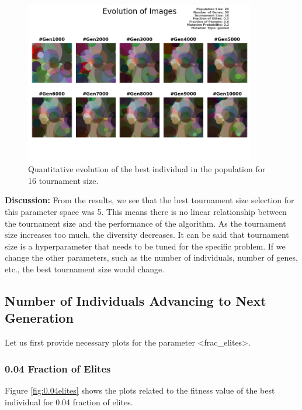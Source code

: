 \documentclass{assignment}
\begin{document}
\begin{figure}[!htb]
    \centering
    \includegraphics[width=0.9\textwidth]{figures/images_output_20_50_16_0.2_0.6_0.2_guided.png}
    \caption{Quantitative evolution of the best individual in the population for 16 tournament size.}
    \label{fig:16tm_image}
\end{figure}

\textbf{Discussion:} From the results, we see that the best tournament size selection for this parameter space was 5. This means there is no linear relationship between the tournament size and the performance of the algorithm. As the tournament size increases too much, the diversity decreases. It can be said that tournament size is a hyperparameter that needs to be tuned for the specific problem. If we change the other parameters, such as the number of individuals, number of genes, etc., the best tournament size would change.

\subsection{Number of Individuals Advancing to Next Generation}
Let us first provide necessary plots for the parameter \textless{}frac\_elites\textgreater{}.

\subsubsection{0.04 Fraction of Elites}
Figure \ref{fig:0.04elites} shows the plots related to the fitness value of the best individual for 0.04 fraction of elites.
\end{document}
